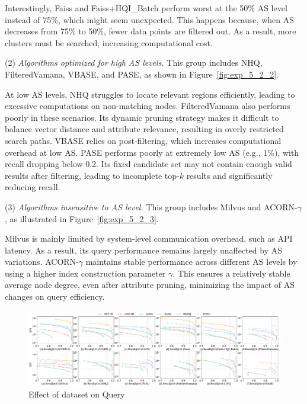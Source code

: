 \documentclass[sigconf, nonacm]{acmart}
\begin{document}
\begin{sloppypar}
Interestingly, Faiss and Faiss+HQI\_Batch perform worst at the 50\% AS level instead of 75\%, which might seem unexpected. This happens because, when AS decreases from 75\% to 50\%, fewer data points are filtered out. As a result, more clusters must be searched, increasing computational cost.

\par
(2) \textit{Algorithms optimized for high AS levels.}  
This group includes NHQ, FilteredVamana, VBASE, and PASE, as shown in Figure~\ref{fig:exp_5_2_2}.

At low AS levels, NHQ struggles to locate relevant regions efficiently, leading to excessive computations on non-matching nodes. FilteredVamana also performs poorly in these scenarios. Its dynamic pruning strategy makes it difficult to balance vector distance and attribute relevance, resulting in overly restricted search paths.
VBASE relies on post-filtering, which increases computational overhead at low AS. PASE performs poorly at extremely low AS (e.g., 1\%), with recall dropping below 0.2. Its fixed candidate set may not contain enough valid results after filtering, leading to incomplete top-$k$ results and significantly reducing recall.

\par
(3) \textit{Algorithms insensitive to AS level.}  
This group includes Milvus and ACORN-\(\gamma\), as illustrated in Figure~\ref{fig:exp_5_2_3}.

Milvus is mainly limited by system-level communication overhead, such as API latency. As a result, its query performance remains largely unaffected by AS variations. ACORN-\(\gamma\) maintains stable performance across different AS levels by using a higher index construction parameter $\gamma$. This ensures a relatively stable average node degree, even after attribute pruning, minimizing the impact of AS changes on query efficiency.

\begin{figure}
    \centering
    \setlength{\abovecaptionskip}{0cm}
    \setlength{\belowcaptionskip}{-0.4cm}
    \includegraphics[width=\textwidth]{figures/exp/exp_6_1.pdf}
    \caption{Effect of dataset on Query}
    \label{fig:exp_6_1}
\end{figure}


\end{sloppypar}
\end{document}

